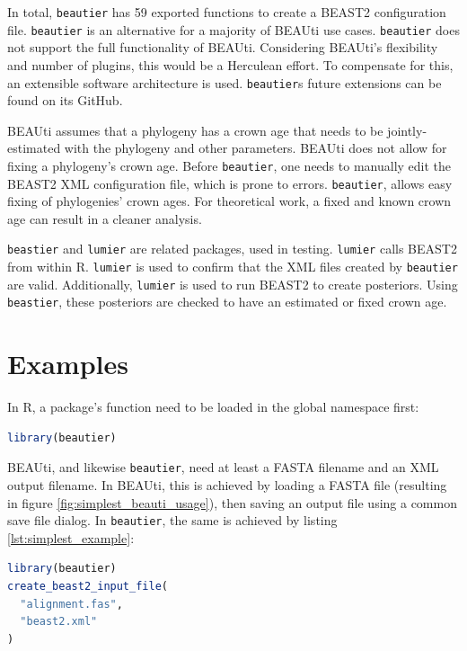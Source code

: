 \documentclass{article}
\begin{document}
In total, \verb;beautier; has 59 exported functions to create
a BEAST2 configuration file. \verb;beautier; is an alternative for a majority of BEAUti use cases.
\verb;beautier; does not support the full functionality of BEAUti. Considering
BEAUti's flexibility and number of plugins, this would be a Herculean effort.
To compensate for this, an extensible software architecture is used.
\verb;beautier;s future extensions can be found on its GitHub.

BEAUti assumes that a phylogeny has a crown age that needs to be jointly-estimated
with the phylogeny and other parameters. BEAUti does not allow for fixing
a phylogeny's crown age. Before \verb;beautier;, one needs to manually edit the BEAST2 
XML configuration file, which is prone to errors. \verb;beautier;, allows easy
fixing of phylogenies' crown ages. For theoretical work, a fixed and known crown age can result
in a cleaner analysis. 

\verb;beastier; and \verb;lumier; are related packages, used in testing. 
\verb;lumier; calls BEAST2 from within R. \verb;lumier; is used to confirm that the XML files 
created by \verb;beautier; are valid. Additionally, \verb;lumier; is used to run BEAST2
to create posteriors. Using \verb;beastier;, these posteriors are checked to have an
estimated or fixed crown age.

\section{Examples}

In R, a package's function need to be loaded in the global namespace first:

\begin{lstlisting}[language=R, caption=Loading, label=lst:loading_beautier, floatplacement=H]
library(beautier)
\end{lstlisting}

BEAUti, and likewise \verb;beautier;, need at least a FASTA filename
and an XML output filename. In BEAUti, this is achieved by loading a FASTA file (resulting
in figure \ref{fig:simplest_beauti_usage}), then saving an output file using a common
save file dialog. In \verb;beautier;, the same is achieved by listing \ref{lst:simplest_example}:

\begin{lstlisting}[language=R, caption=Simplest example, label=lst:simplest_example, floatplacement=H]
library(beautier)
create_beast2_input_file(
  "alignment.fas",
  "beast2.xml"
)
\end{lstlisting}
\end{document}
